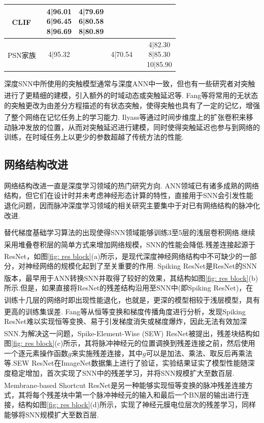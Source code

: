 \documentclass[10.5pt,compsoc,UTF8]{CjC}
\theoremstyle{mystyle}
\newcommand{\upcite}[1]{\textsuperscript{\cite{#1}}}
\begin{document}
\begin{multicols}{1}
\begin{table}[H]
\begin{center}
\begin{tabular}{cccccc}
	CLIF~\upcite{huang2024clif} & \makecell[c]{4|96.01\\6|96.45\\8|96.69} &\makecell[c]{4|79.69\\6|80.58\\8|80.89} & & & \\
	\hline
	PSN家族~\upcite{fang2023parallel} &4|95.32 & &4|70.54 & &\makecell[c]{4|82.30\\8|85.30\\10|85.90}\\
	\bottomrule
\end{tabular}
		\label{tab: neuron acc}
	\end{center}
\end{table}




深度SNN中所使用的突触模型通常与深度ANN中一致，但也有一些研究者对突触进行了更精细的建模，引入额外的时域动态或突触延迟等.
Fang等\upcite{SNN-IIR}将常用的无状态的突触更改为由差分方程描述的有状态突触，使得突触也具有了一定的记忆，增强了整个网络在记忆任务上的学习能力.
Ilyass等\upcite{hammouamri2024learning}通过时间步维度上的扩张卷积来移动脉冲发放的位置，从而对突触延迟进行建模，同时使得突触延迟也参与到网络的训练，在时域任务上以更少的参数超越了传统方法的性能.


\subsection{网络结构改进}%
网络结构改进一直是深度学习领域的热门研究方向. ANN领域已有诸多成熟的网络结构，但它们在设计时并未考虑神经形态计算的特性，直接用于SNN会引发性能退化问题，因而脉冲深度学习领域的相关研究主要集中于对已有网络结构的脉冲化改进. 


替代梯度基础学习算法的出现使得SNN领域能够训练3至5层的浅层卷积网络.继续采用堆叠卷积层的简单方式来增加网络规模，SNN的性能会降低.残差连接\upcite{he2016deep}起源于ResNet\upcite{he2016deep}，如图\ref{fig: res block}(a)所示，是现代深度神经网络结构中不可缺少的一部分，对神经网络的规模化起到了至关重要的作用.
Spiking ResNet是ResNet的SNN版本，最早用于ANN转换SNN\upcite{hu2020spiking}并取得了较好的效果，其结构如图\ref{fig: res block}(b)所示.但是，如果直接将ResNet的残差结构沿用至SNN中(即Spiking ResNet)，在训练十几层的网络时即出现性能退化\upcite{zheng2020going}，也就是，更深的模型相较于浅层模型，具有更高的训练集误差. Fang等\upcite{SEWResNet}从恒等变换和梯度传播角度进行分析，发现Spiking ResNet难以实现恒等变换、易于引发梯度消失或梯度爆炸，因此无法有效加深SNN.为解决这一问题，Spike-Element-Wise (SEW) ResNet\upcite{SEWResNet}被提出，残差块结构如图\ref{fig: res block}(c)所示，其将脉冲神经元的位置调换到残差连接之前，然后使用一个逐元素操作函数$g$来实施残差连接，其中$g$可以是加法、乘法、取反后再乘法等.SEW ResNet在ImageNet数据集上进行了验证，实验结果证实了模型性能随深度稳定增加，首次实现了SNN中的残差学习，并将SNN规模扩大至数百层.
Membrane-based Shortcut ResNet\upcite{10428029}是另一种能够实现恒等变换的脉冲残差连接方式，其将每个残差块中第一个脉冲神经元的输入和最后一个BN层的输出进行连接，结构如图\ref{fig: res block}(d)所示，实现了神经元膜电位层次的残差学习，同样能够将SNN规模扩大至数百层.


\end{multicols}
\end{document}
